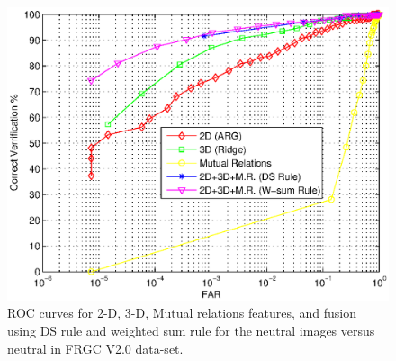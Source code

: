 {\begin{figure}[tbp]
\begin{center}
\includegraphics[scale = 0.6]{./chapters/figures/roc_frgc_370.eps}
\caption{ROC curves for 2-D, 3-D, Mutual relations features, and
fusion using DS rule and weighted sum rule for the neutral images
versus neutral in FRGC V2.0
data-set.}\label{fig_results_Neutral_ROC}
\end{center}
\end{figure}

}
